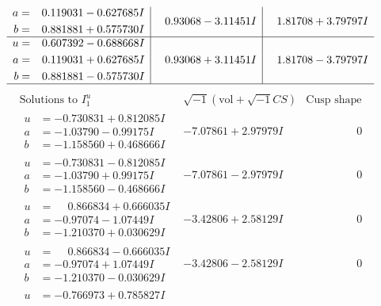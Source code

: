 \documentclass[1p]{elsarticle_modified}
\theoremstyle{definition}
\newcommand{\I}{\sqrt{-1}}
\begin{document}
$$\begin{array}{c|c|c}
\begin{aligned}
a &= \phantom{-}0.119031 - 0.627685 I \\
b &= \phantom{-}0.881881 + 0.575730 I\end{aligned}
 & \phantom{-}0.93068 - 3.11451 I & \phantom{-}1.81708 + 3.79797 I \\ \hline\begin{aligned}
u &= \phantom{-}0.607392 - 0.688668 I \\
a &= \phantom{-}0.119031 + 0.627685 I \\
b &= \phantom{-}0.881881 - 0.575730 I\end{aligned}
 & \phantom{-}0.93068 + 3.11451 I & \phantom{-}1.81708 - 3.79797 I\\
 \hline 
 \end{array}$$\newpage$$\begin{array}{c|c|c}  
\text{Solutions to }I^u_{1}& \I (\text{vol} + \sqrt{-1}CS) & \text{Cusp shape}\\
 \hline 
\begin{aligned}
u &= -0.730831 + 0.812085 I \\
a &= -1.03790 - 0.99175 I \\
b &= -1.158560 + 0.468666 I\end{aligned}
 & -7.07861 + 2.97979 I & \phantom{-0.000000 } 0 \\ \hline\begin{aligned}
u &= -0.730831 - 0.812085 I \\
a &= -1.03790 + 0.99175 I \\
b &= -1.158560 - 0.468666 I\end{aligned}
 & -7.07861 - 2.97979 I & \phantom{-0.000000 } 0 \\ \hline\begin{aligned}
u &= \phantom{-}0.866834 + 0.666035 I \\
a &= -0.97074 - 1.07449 I \\
b &= -1.210370 + 0.030629 I\end{aligned}
 & -3.42806 + 2.58129 I & \phantom{-0.000000 } 0 \\ \hline\begin{aligned}
u &= \phantom{-}0.866834 - 0.666035 I \\
a &= -0.97074 + 1.07449 I \\
b &= -1.210370 - 0.030629 I\end{aligned}
 & -3.42806 - 2.58129 I & \phantom{-0.000000 } 0 \\ \hline\begin{aligned}
u &= -0.766973 + 0.785827 I \\

\end{aligned}
\end{array}$$
\end{document}
